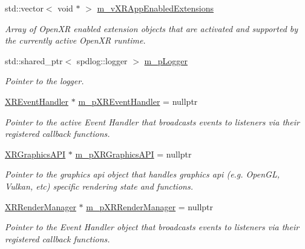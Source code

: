 \begin{DoxyCompactItemize}
std\+::vector$<$ void $\ast$ $>$ \mbox{\hyperlink{class_open_x_r_provider_1_1_x_r_provider_a4d4e90698cf0bd5c71433f5fee3133ed}{m\+\_\+v\+X\+R\+App\+Enabled\+Extensions}}
\begin{DoxyCompactList}\small\item\em Array of Open\+XR enabled extension objects that are activated and supported by the currently active Open\+XR runtime. \end{DoxyCompactList}\item 
std\+::shared\+\_\+ptr$<$ spdlog\+::logger $>$ \mbox{\hyperlink{class_open_x_r_provider_1_1_x_r_provider_aa03872a4d32010786389d57f1c9dad6e}{m\+\_\+p\+Logger}}
\begin{DoxyCompactList}\small\item\em Pointer to the logger. \end{DoxyCompactList}\item 
\mbox{\hyperlink{class_open_x_r_provider_1_1_x_r_event_handler}{X\+R\+Event\+Handler}} $\ast$ \mbox{\hyperlink{class_open_x_r_provider_1_1_x_r_provider_a567e5a128da44ded57c3a666704a9c17}{m\+\_\+p\+X\+R\+Event\+Handler}} = nullptr
\begin{DoxyCompactList}\small\item\em Pointer to the active Event Handler that broadcasts events to listeners via their registered callback functions. \end{DoxyCompactList}\item 
\mbox{\hyperlink{class_open_x_r_provider_1_1_x_r_graphics_a_p_i}{X\+R\+Graphics\+A\+PI}} $\ast$ \mbox{\hyperlink{class_open_x_r_provider_1_1_x_r_provider_a981c5add10cfe23149e821b470145957}{m\+\_\+p\+X\+R\+Graphics\+A\+PI}} = nullptr
\begin{DoxyCompactList}\small\item\em Pointer to the graphics api object that handles graphics api (e.\+g. Open\+GL, Vulkan, etc) specific rendering state and functions. \end{DoxyCompactList}\item 
\mbox{\hyperlink{class_open_x_r_provider_1_1_x_r_render_manager}{X\+R\+Render\+Manager}} $\ast$ \mbox{\hyperlink{class_open_x_r_provider_1_1_x_r_provider_a688536257f6d9329e2d431b1249a708a}{m\+\_\+p\+X\+R\+Render\+Manager}} = nullptr
\begin{DoxyCompactList}\small\item\em Pointer to the Event Handler object that broadcasts events to listeners via their registered callback functions. \end{DoxyCompactList}\item 

\end{DoxyCompactItemize}
